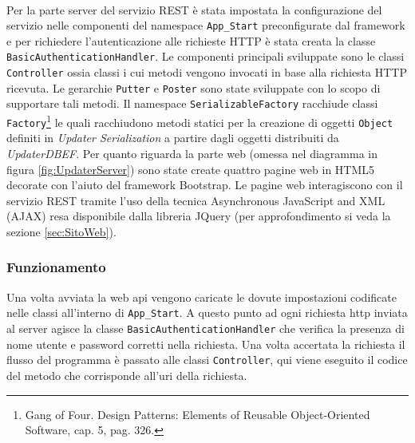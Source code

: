 \documentclass[../RelazioneFinale.tex]{subfiles}
\begin{document}
				
				\paragraph{}
					Per la parte server del servizio REST è stata impostata la configurazione del servizio nelle componenti del namespace \verb|App_Start| preconfigurate dal framework e per richiedere l'autenticazione alle richieste HTTP è stata creata la classe \verb|BasicAuthenticationHandler|. Le componenti principali sviluppate sono le classi \verb|Controller| ossia classi i cui metodi vengono invocati in base alla richiesta HTTP ricevuta. Le gerarchie \verb|Putter| e \verb|Poster| sono state sviluppate con lo scopo di supportare tali metodi.
					Il namespace \verb|SerializableFactory| racchiude classi \verb|Factory|\footnote{\cite{gamma1994design} Gang of Four. Design Patterns: Elements of Reusable Object-Oriented Software, cap. 5, pag. 326.} le quali racchiudono metodi statici per la creazione di oggetti \verb|Object| definiti in \emph{Updater Serialization} a partire dagli oggetti distribuiti da \emph{UpdaterDBEF}.
					Per quanto riguarda la parte web (omessa nel diagramma in figura \ref{fig:UpdaterServer}) sono state create quattro pagine web in HTML5 decorate con l'aiuto del framework Bootstrap. Le pagine web interagiscono con il servizio REST tramite l'uso della tecnica Asynchronous JavaScript and XML (AJAX) resa disponibile dalla libreria JQuery (per approfondimento si veda la sezione \ref{sec:SitoWeb}). 
			
			\subsubsection{Funzionamento}
				Una volta avviata la web api vengono caricate le dovute impostazioni codificate nelle classi all'interno di \verb|App_Start|. A questo punto ad ogni richiesta http inviata al server agisce la classe \verb|BasicAuthenticationHandler| che verifica la presenza di nome utente e password corretti nella richiesta.
				Una volta accertata la richiesta il flusso del programma è passato alle classi \verb|Controller|, qui viene eseguito il codice del metodo che corrisponde all'uri della richiesta.
		
\end{document}
